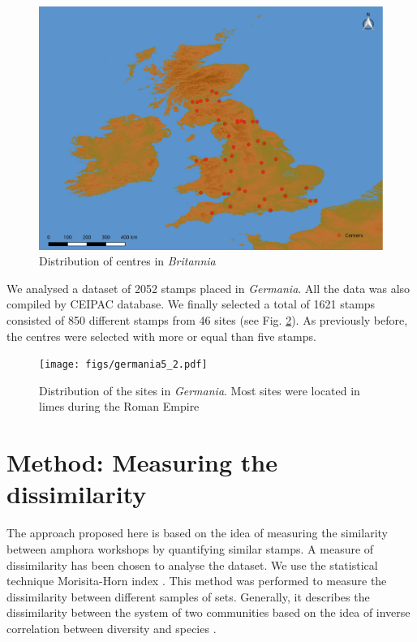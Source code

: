 \documentclass[review]{elsarticle}
\newcommand{\memo}[2]{\textcolor{#1}{#2}}
\newcommand{\xavi}[1]{\memo{magenta}{XRC: #1\\}}
\begin{document}
\begin{figure}[htp]
	\centering
\includegraphics[width=\linewidth]{figs/britmap2.pdf}
\caption{Distribution of centres in \textit{Britannia}}
\label{britannia}
\end{figure} 


We analysed a dataset of 2052 stamps placed in \textit{Germania}. All the data was also compiled by CEIPAC database. We finally selected a total of 1621 stamps consisted of 850 different stamps from 46 sites (see Fig. \ref{germania}). As previously before, the centres were selected with more or equal than five stamps. 


\begin{figure}[htp]
	\centering
\texttt{[image: figs/germania5\_2.pdf]}
\caption{Distribution of the sites in \textit{Germania}. Most sites were located in limes during the Roman Empire}
\label{germania}
\end{figure}



\section{Method: Measuring the dissimilarity}



The approach proposed here is based on the idea of measuring the similarity between amphora workshops by quantifying similar stamps. A measure of dissimilarity has been chosen to analyse the dataset. We use the statistical technique Morisita-Horn index \citep{morisita_measuring_1959, horn_measurement_1966}. This method was performed to measure the dissimilarity between different samples of sets. Generally, it describes the dissimilarity between the system of two communities based on the idea of inverse correlation between diversity and species \citep{magurran_why_1988}.
\end{document}
